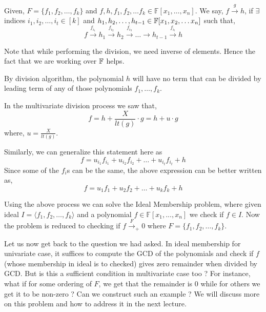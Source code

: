 \begin{definition}
Given, $F = \{f_1,f_2, \ldots ,f_k\}$ and $f,h,f_1,f_2, \ldots f_k \in
\mathbb{F}[x_1,\ldots,x_n]$.  We say, $f \stackrel{g}{\longrightarrow} h$, if
$\exists$ indices $i_1,i_2, \ldots ,i_t \in [k]$ and $h_1,h_2, \ldots ,h_{t-1}
\in {\mathbb{F}[x_1,x_2, \ldots x_n]}$ such that, 
\[f \stackrel{f_{i_1}}{\longrightarrow} h_1\stackrel{f_{i_2}} {\longrightarrow}
h_2 \stackrel{ f_{i_3}}{\longrightarrow}\ldots \longrightarrow h_{t-1}
\stackrel{f_{i_t}}{\longrightarrow} h \]
\end{definition}

\begin{observation}
	Note that while performing the division, we need inverse of elements.
	Hence the fact that we are working over ${\mathbb{F}}$ helps.
\end{observation}
\begin{observation}
By division algorithm, the polynomial $h$ will have no term that can be
divided by leading term of any of those polynomials $f_1,\ldots ,f_k$.
\end{observation}
In the multivariate division process we saw that, $$ f = h +
\frac{X}{lt(g)}\cdot g  = h + u\cdot g$$ where, $u = \frac{X}{lt(g)}$.

Similarly, we can generalize this statement here as
$$ f = u_{i_1}f_{i_1} + u_{i_2}f_{i_2} + \ldots + u_{i_t}f_{i_t} + h $$
Since some of the $f_i$s can be the same, the above expression can be better
written as,
$$ f = u_1f_1 + u_2f_2 + \ldots + u_kf_k + h $$

\begin{observation}
Using the above process we can solve the Ideal Membership problem, where given
ideal $I = \langle f_1,f_2, \ldots ,f_k \rangle$ and a polynomial $f \in
\mathbb{F}[x_1,...,x_n]$ we check if $f \in I$. Now the problem is reduced to 
checking if $f \stackrel{F}{\longrightarrow}_{+} 0$ where $F = \{f_1,f_2,
\ldots ,f_k\}$.
\end{observation}

Let us now get back to the question we had asked. In ideal membership for
univariate case, it suffices to compute the GCD of the polynomials and check
if $f$ (whose membership in ideal is to checked) gives zero remainder when
divided by GCD. But is this a sufficient condition in multivariate case too ?
For instance, what if for some ordering of $F$, we get that the remainder is
$0$ while for others we get it to be non-zero ? Can we construct such 
an example ? We will discuss more on this problem and how to address it in the next lecture. 

